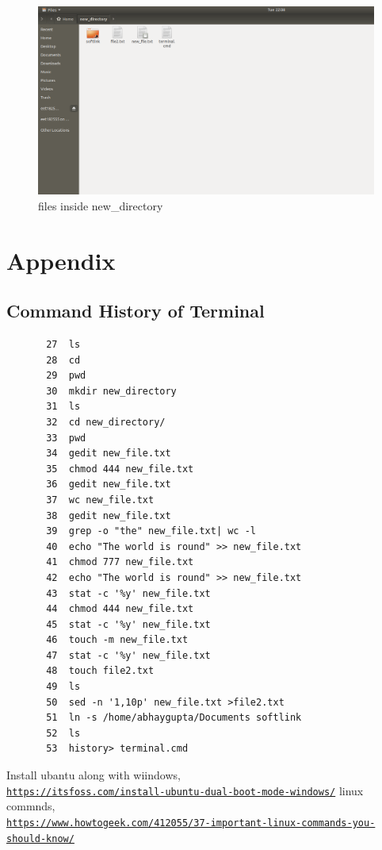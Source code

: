 \documentclass[12pt,a4paper]{article}
\begin{document}
			\begin{figure}[h!]
				\centering
				\caption{files inside new\_directory}
				\includegraphics[scale=.3]{direc.png}
			\end{figure}

		
	
		\clearpage
	\section{Appendix}
		\subsection{Command History of Terminal}
		\begin{verbatim}
       27  ls
       28  cd
       29  pwd
       30  mkdir new_directory
       31  ls
       32  cd new_directory/
       33  pwd
       34  gedit new_file.txt
       35  chmod 444 new_file.txt 
       36  gedit new_file.txt 
       37  wc new_file.txt 
       38  gedit new_file.txt 
       39  grep -o "the" new_file.txt| wc -l
       40  echo "The world is round" >> new_file.txt 
       41  chmod 777 new_file.txt 
       42  echo "The world is round" >> new_file.txt 
       43  stat -c '%y' new_file.txt
       44  chmod 444 new_file.txt 
       45  stat -c '%y' new_file.txt
       46  touch -m new_file.txt 
       47  stat -c '%y' new_file.txt
       48  touch file2.txt
       49  ls
       50  sed -n '1,10p' new_file.txt >file2.txt 
       51  ln -s /home/abhaygupta/Documents softlink
       52  ls
       53  history> terminal.cmd
		\end{verbatim}
		\begin{thebibliography}{9}
Install ubantu along with wiindows,
\\\href{https://itsfoss.com/install-ubuntu-dual-boot-mode-windows/}{\texttt{https://itsfoss.com/install-ubuntu-dual-boot-mode-windows/}}
linux commnds,
\\\href{https://www.howtogeek.com/412055/37-important-linux-commands-you-should-know/}{\texttt{https://www.howtogeek.com/412055/37-important-linux-commands-you-should-know/}}
\end{thebibliography}
\end{document}
